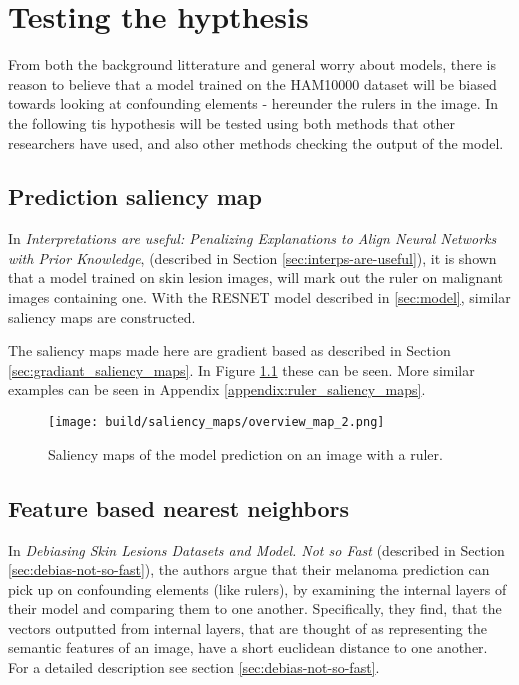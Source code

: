 \chapter{Testing the hypthesis}
From both the background litterature and general worry about models,
there is reason to believe that a model trained on the HAM10000 dataset will be biased
towards looking at confounding elements - hereunder the rulers in the image.
In the following tis hypothesis will be tested using both methods that other researchers have used,
and also other methods checking the output of the model.

\section{Prediction saliency map}\label{sec:prediction-saliency-map}
In \textit{Interpretations are useful: Penalizing Explanations to Align Neural Networks with Prior Knowledge}\cite{interps-are-useful},
(described in Section \ref{sec:interps-are-useful}), it is shown that a model trained on skin lesion images,
will mark out the ruler on malignant images containing one.
With the RESNET model described in \ref{sec:model}, similar saliency maps are constructed.

The saliency maps made here are gradient based as described in Section \ref{sec:gradiant_saliency_maps}.
In Figure \ref{fig:ruler_saliency_map} these can be seen.
More similar examples can be seen in Appendix \ref{appendix:ruler_saliency_maps}.

\begin{figure}[h]
    \texttt{[image: build/saliency\_maps/overview\_map\_2.png]}
    \caption{Saliency maps of the model prediction on an image with a ruler.}
    \label{fig:ruler_saliency_map}
\end{figure}

\section{Feature based nearest neighbors}
In \textit{Debiasing Skin Lesions Datasets and Model. Not so Fast}\cite{debias-not-so-fast} (described in Section \ref{sec:debias-not-so-fast}),
the authors argue that their melanoma prediction can pick up on confounding elements (like rulers),
by examining the internal layers of their model and comparing them to one another.
Specifically, they find, that the vectors outputted from internal layers,
that are thought of as representing the semantic features of an image,
have a short euclidean distance to one another.
For a detailed description see section \ref{sec:debias-not-so-fast}.

